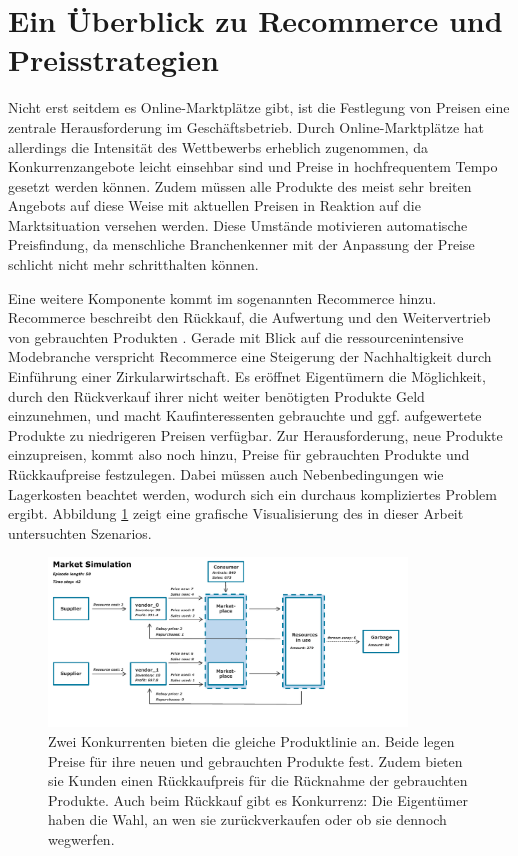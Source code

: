 \section{Ein Überblick zu Recommerce und Preisstrategien}
Nicht erst seitdem es Online-Marktplätze gibt, ist die Festlegung von Preisen eine zentrale Herausforderung im Geschäftsbetrieb.
Durch Online-Marktplätze hat allerdings die Intensität des Wettbewerbs erheblich zugenommen, da Konkurrenzangebote leicht einsehbar sind und Preise in hochfrequentem Tempo gesetzt werden können.
Zudem müssen alle Produkte des meist sehr breiten Angebots auf diese Weise mit aktuellen Preisen in Reaktion auf die Marktsituation versehen werden.
Diese Umstände motivieren automatische Preisfindung, da menschliche Branchenkenner mit der Anpassung der Preise schlicht nicht mehr schritthalten können.

Eine weitere Komponente kommt im sogenannten Recommerce hinzu.
Recommerce beschreibt den Rückkauf, die Aufwertung und den Weitervertrieb von gebrauchten Produkten \cite{deges2019grundlagen}.
Gerade mit Blick auf die ressourcenintensive Modebranche verspricht Recommerce eine Steigerung der Nachhaltigkeit durch Einführung einer Zirkularwirtschaft.
Es eröffnet Eigentümern die Möglichkeit, durch den Rückverkauf ihrer nicht weiter benötigten Produkte Geld einzunehmen, und macht Kaufinteressenten gebrauchte und ggf. aufgewertete Produkte zu niedrigeren Preisen verfügbar.
Zur Herausforderung, neue Produkte einzupreisen, kommt also noch hinzu, Preise für gebrauchten Produkte und Rückkaufpreise festzulegen.
Dabei müssen auch Nebenbedingungen wie Lagerkosten beachtet werden, wodurch sich ein durchaus kompliziertes Problem ergibt.
Abbildung \ref{grafic:MarketOverview} zeigt eine grafische Visualisierung des in dieser Arbeit untersuchten Szenarios.

\begin{figure}[htbp]
	\centering
	\includegraphics[width=0.85\textwidth]{introduction/MarketOverview_042.pdf}
	\caption{
		Zwei Konkurrenten bieten die gleiche Produktlinie an.
		Beide legen Preise für ihre neuen und gebrauchten Produkte fest.
		Zudem bieten sie Kunden einen Rückkaufpreis für die Rücknahme der gebrauchten Produkte.
		Auch beim Rückkauf gibt es Konkurrenz: Die Eigentümer haben die Wahl, an wen sie zurückverkaufen oder ob sie dennoch wegwerfen.
	}
	\label{grafic:MarketOverview}
\end{figure}

